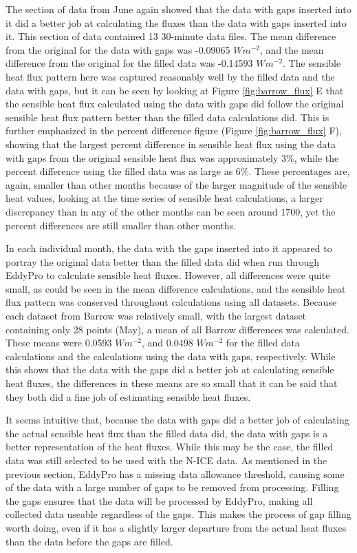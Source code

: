 The section of data from June again showed that the data with gaps inserted into it did a better job at calculating the fluxes than the data with gaps inserted into it. This section of data contained 13 30-minute data files. The mean difference from the original for the data with gaps was -0.09065 $Wm^{-2}$, and the mean difference from the original for the filled data was -0.14593 $Wm^{-2}$. The sensible heat flux pattern here was captured reasonably well by the filled data and the data with gaps, but it can be seen by looking at Figure \ref{fig:barrow_flux} E that the sensible heat flux calculated using the data with gaps did follow the original sensible heat flux pattern better than the filled data calculations did. This is further emphasized in the percent difference figure (Figure \ref{fig:barrow_flux} F), showing that the largest percent difference in sensible heat flux using the data with gaps from the original sensible heat flux was approximately 3$\%$, while the percent difference using the filled data was as large as 6$\%$. These percentages are, again, smaller than other months because of the larger magnitude of the sensible heat values, looking at the time series of sensible heat calculations, a larger discrepancy than in any of the other months can be seen around 1700, yet the percent differences are still smaller than other months.

In each individual month, the data with the gaps inserted into it appeared to portray the original data better than the filled data did when run through EddyPro to calculate sensible heat fluxes. However, all differences were quite small, as could be seen in the mean difference calculations, and the sensible heat flux pattern was conserved throughout calculations using all datasets. Because each dataset from Barrow was relatively small, with the largest dataset containing only 28 points (May), a mean of all Barrow differences was calculated. These means were 0.0593 $Wm^{-2}$, and 0.0498 $Wm^{-2}$ for the filled data calculations and the calculations using the data with gaps, respectively. While this shows that the data with the gaps did a better job at calculating sensible heat fluxes, the differences in these means are so small that it can be said that they both did a fine job of estimating sensible heat fluxes. 

It seems intuitive that, because the data with gaps did a better job of calculating the actual sensible heat flux than the filled data did, the data with gaps is a better representation of the heat fluxes. While this may be the case, the filled data was still selected to be used with the N-ICE data. As mentioned in the previous section, EddyPro has a missing data allowance threshold, causing some of the data with a large number of gaps to be removed from processing. Filling the gaps ensures that the data will be processed by EddyPro, making all collected data useable regardless of the gaps. This makes the process of gap filling worth doing, even if it has a slightly larger departure from the actual heat fluxes than the data before the gaps are filled. 

